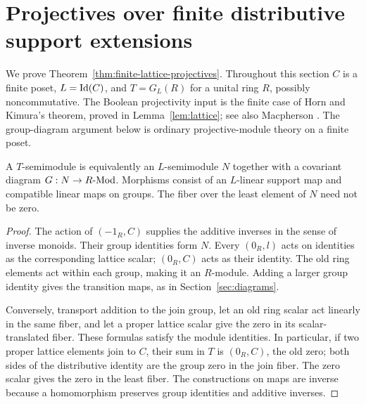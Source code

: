 \section{Projectives over finite distributive support extensions}
\label{sec:finite-lattice-projectives}
We prove Theorem~\ref{thm:finite-lattice-projectives}. Throughout this
section $C$ is a finite poset, $L=\operatorname{Id}(C)$, and
$T=G_L(R)$ for a unital ring $R$, possibly noncommutative. The Boolean
projectivity input is the finite case of Horn and Kimura's theorem,
proved in Lemma~\ref{lem:lattice}; see also Macpherson
\cite[Theorem~3.9]{Macpherson}. The group-diagram argument below is
ordinary projective-module theory on a finite poset.

\begin{lemma}\label{lem:lattice-module-data}
A $T$-semimodule is equivalently an $L$-semimodule $N$ together with a
covariant diagram $G:N\to R\text{-}\mathrm{Mod}$. Morphisms consist of an
$L$-linear support map and compatible linear maps on groups. The fiber
over the least element of $N$ need not be zero.
\end{lemma}
\begin{proof}
The action of $(-1_R,C)$ supplies the additive inverses in the sense
of inverse monoids. Their group identities form $N$. Every
$(0_R,l)$ acts on identities as the corresponding lattice scalar;
$(0_R,C)$ acts as their identity. The old ring elements act within
each group, making it an $R$-module. Adding a larger group identity
gives the transition maps, as in Section~\ref{sec:diagrams}.

Conversely, transport addition to the join group, let an old ring
scalar act linearly in the same fiber, and let a proper lattice scalar
give the zero in its scalar-translated fiber. These formulas satisfy
the module identities. In particular, if two proper lattice elements
join to $C$, their sum in $T$ is $(0_R,C)$, the old zero; both sides of
the distributive identity are the group zero in the join fiber.
The zero scalar gives the zero in the least fiber. The constructions
on maps are inverse because a homomorphism preserves group identities
and additive inverses.
\end{proof}


